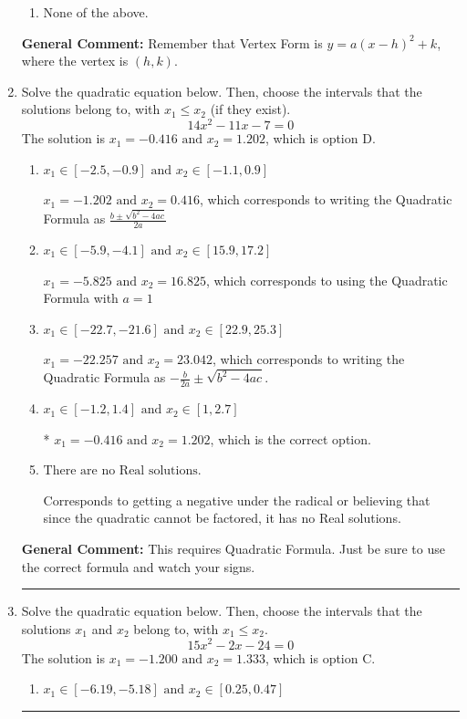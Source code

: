 \documentclass{extbook}[14pt]
\newcommand{\litem}[1]{\item #1

\rule{\textwidth}{0.4pt}}
\begin{document}
\begin{enumerate}
{\begin{enumerate}[label=\Alph*.]
\item None of the above.\end{enumerate}
\textbf{General Comment:} Remember that Vertex Form is $y = a(x-h)^2+k$, where the vertex is $(h, k)$.
}
\litem{
Solve the quadratic equation below. Then, choose the intervals that the solutions belong to, with $x_1 \leq x_2$ (if they exist).
\[ 14x^{2} -11 x -7 = 0 \]The solution is \( x_1 = -0.416 \text{ and } x_2 = 1.202 \), which is option D.\begin{enumerate}[label=\Alph*.]
\item \( x_1 \in [-2.5, -0.9] \text{ and } x_2 \in [-1.1, 0.9] \)

 $x_1 = -1.202 \text{ and } x_2 = 0.416$, which corresponds to writing the Quadratic Formula as $\frac{b \pm \sqrt{b^2 - 4ac}}{2a}$
\item \( x_1 \in [-5.9, -4.1] \text{ and } x_2 \in [15.9, 17.2] \)

 $x_1 = -5.825 \text{ and } x_2 = 16.825$, which corresponds to using the Quadratic Formula with $a=1$
\item \( x_1 \in [-22.7, -21.6] \text{ and } x_2 \in [22.9, 25.3] \)

 $x_1 = -22.257 \text{ and } x_2 = 23.042$, which corresponds to writing the Quadratic Formula as $-\frac{b}{2a} \pm \sqrt{b^2 - 4ac}$.
\item \( x_1 \in [-1.2, 1.4] \text{ and } x_2 \in [1, 2.7] \)

* $x_1 = -0.416 \text{ and } x_2 = 1.202$, which is the correct option.
\item \( \text{There are no Real solutions.} \)

Corresponds to getting a negative under the radical or believing that since the quadratic cannot be factored, it has no Real solutions.
\end{enumerate}

\textbf{General Comment:} This requires Quadratic Formula. Just be sure to use the correct formula and watch your signs.
}
\litem{
Solve the quadratic equation below. Then, choose the intervals that the solutions $x_1$ and $x_2$ belong to, with $x_1 \leq x_2$.
\[ 15x^{2} -2 x -24 = 0 \]The solution is \( x_1 = -1.200 \text{ and } x_2 = 1.333 \), which is option C.\begin{enumerate}[label=\Alph*.]
\item \( x_1 \in [-6.19, -5.18] \text{ and } x_2 \in [0.25, 0.47] \)


\end{enumerate}}
\end{enumerate}
\end{document}
